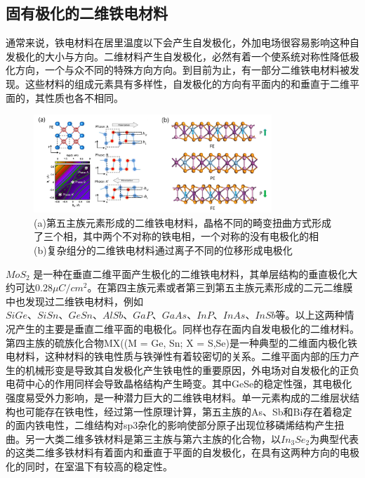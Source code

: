 \subsection{固有极化的二维铁电材料}

通常来说，铁电材料在居里温度以下会产生自发极化，外加电场很容易影响这种自发极化的大小与方向。二维材料产生自发极化，必然有着一个使系统对称性降低极化方向，一个与众不同的特殊方向方向。到目前为止，有一部分二维铁电材料被发现。这些材料的组成元素具有多样性，自发极化的方向有平面内的和垂直于二维平面的，其性质也各不相同。

\begin{figure}[h]
    \centering
\includegraphics[width=0.8\textwidth]{./pic/016.png}
\caption{(a)第五主族元素形成的二维铁电材料，晶格不同的畸变扭曲方式形成了三个相，其中两个不对称的铁电相，一个对称的没有电极化的相(b)复杂组分的二维铁电材料通过离子不同的位移形成电极化}

\label{dog016}
\end{figure}

$MoS_{2}$ 是一种在垂直二维平面产生极化的二维铁电材料，其单层结构的垂直极化大约可达$0.28μC/cm^{2}$。在第四主族元素或者第三到第五主族元素形成的二元二维膜中也发现过二维铁电材料，例如$SiGe\text{、}SiSn\text{、}GeSn\text{、}AlSb\text{、}GaP\text{、}GaAs\text{、}InP\text{、}InAs\text{、}InSb$等。以上这两种情况产生的主要是垂直二维平面的电极化。同样也存在面内自发电极化的二维材料。第四主族的硫族化合物MX((M = Ge, Sn; X = S,Se)是一种典型的二维面内极化铁电材料，这种材料的铁电性质与铁弹性有着较密切的关系。二维平面内部的压力产生的机械形变是导致其自发极化产生铁电性的重要原因，外电场对自发极化的正负电荷中心的作用同样会导致晶格结构产生畸变。其中GeSe的稳定性强，其电极化强度易受外力影响，是一种潜力巨大的二维铁电材料。单一元素构成的二维层状结构也可能存在铁电性，经过第一性原理计算，第五主族的As、Sb和Bi存在着稳定的面内铁电性，二维结构对sp3杂化的影响使部分原子出现位移磷烯结构产生扭曲。另一大类二维多铁材料是第三主族与第六主族的化合物，以$In_{3}Se_{2}$为典型代表的这类二维多铁材料有着面内和垂直于平面的自发极化，在具有这两种方向的电极化的同时，在室温下有较高的稳定性。

